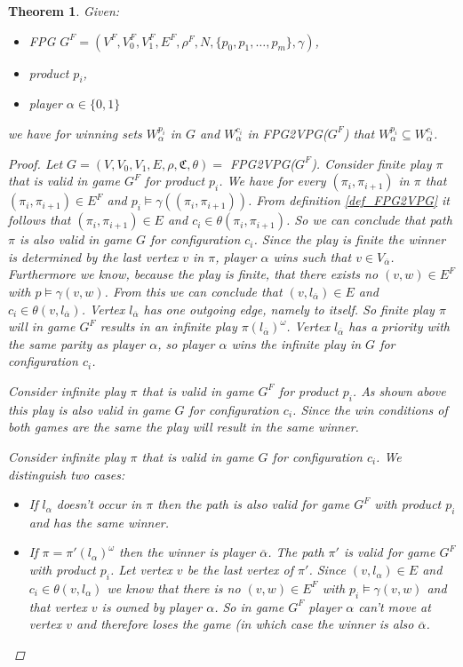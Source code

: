 \documentclass[]{article}
\newtheorem{theorem}{Theorem}[section]
\begin{document}
\begin{theorem}
	\label{the_FPG_sub_VPG}
	Given:
	\begin{itemize}
		\item FPG $G^F = (V^F, V_0^F, V_1^F, E^F, \rho^F, N, \{p_0, p_1, \dots, p_m\}, \gamma)$,
		\item product $p_i$,
		\item player $\alpha \in \{0,1\}$
	\end{itemize}
we have for winning sets $W_\alpha^{p_i}$ in $G$ and $W_\alpha^{c_i}$ in FPG2VPG($G^F$) that $W_\alpha^{p_i} \subseteq W_\alpha^{c_i}$.
\begin{proof}
	Let $G = (V,V_0,V_1, E, \rho, \mathfrak{C},\theta) =$ FPG2VPG($G^F$). Consider finite play $\pi$ that is valid in game $G^F$ for product $p_i$. We have for every $(\pi_i, \pi_{i+1})$ in $\pi$ that $(\pi_i, \pi_{i+1}) \in E^F$ and $p_i \models \gamma((\pi_i, \pi_{i+1}))$. From definition \ref{def_FPG2VPG} it follows that $(\pi_i, \pi_{i+1}) \in E$ and $c_i \in \theta(\pi_i, \pi_{i+1})$. So we can conclude that path $\pi$ is also valid in game $G$ for configuration $c_i$. Since the play is finite the winner is determined by the last vertex $v$ in $\pi$, player $\alpha$ wins such that $v \in V_{\overline{\alpha}}$. Furthermore we know, because the play is finite, that there exists no $(v,w) \in E^F$ with $p \models \gamma(v,w)$. From this we can conclude that $(v, l_{\overline{\alpha}}) \in E$ and $c_i \in \theta(v, l_{\overline{\alpha}})$. Vertex $l_{\overline{\alpha}}$ has one outgoing edge, namely to itself. So finite play $\pi$ will in game $G^F$ results in an infinite play $\pi(l_{\overline{\alpha}})^\omega$. Vertex $l_{\overline{\alpha}}$ has a priority with the same parity as player $\alpha$, so player $\alpha$ wins the infinite play in $G$ for configuration $c_i$.
	
	Consider infinite play $\pi$ that is valid in game $G^F$ for product $p_i$. As shown above this play is also valid in game $G$ for configuration $c_i$. Since the win conditions of both games are the same the play will result in the same winner.
	
	Consider infinite play $\pi$ that is valid in game $G$ for configuration $c_i$. We distinguish two cases:
	\begin{itemize}
		\item If $l_\alpha$ doesn't occur in $\pi$ then the path is also valid for game $G^F$ with product $p_i$ and has the same winner.
		\item If $\pi = \pi'(l_\alpha)^\omega$ then the winner is player $\overline{\alpha}$. The path $\pi'$ is valid for game $G^F$ with product $p_i$. Let vertex $v$ be the last vertex of $\pi'$. Since $(v, l_\alpha) \in E$ and $c_i \in \theta(v,l_\alpha)$ we know that there is no $(v,w) \in E^F$ with $p_i \models \gamma(v,w)$ and that vertex $v$ is owned by player $\alpha$. So in game $G^F$ player $\alpha$ can't move at vertex $v$ and therefore loses the game (in which case the winner is also $\overline{\alpha}$.
	\end{itemize}


\end{proof}
\end{theorem}
\end{document}
